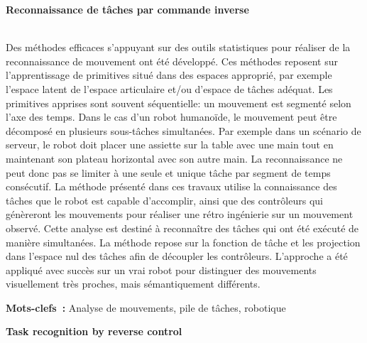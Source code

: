 
\markboth{}{}
\pagestyle{empty}

{\small
\noindent\begin{normalsize}\textbf{Reconnaissance de t\^aches par commande inverse}\end{normalsize}\\

Des méthodes efficaces s'appuyant sur des outils statistiques pour réaliser de la reconnaissance de mouvement ont été développé. Ces méthodes reposent sur l'apprentissage de primitives situé dans des espaces approprié, par exemple l'espace latent de l'espace articulaire et/ou d'espace de tâches
adéquat. Les primitives apprises sont souvent séquentielle: un mouvement est segmenté selon l'axe des temps. Dans le cas d'un robot humanoïde, le mouvement peut être décomposé en plusieurs sous-tâches
simultanées. Par exemple dans un scénario de serveur, le robot doit placer une assiette sur la table avec une main tout en maintenant son plateau horizontal avec son autre main. La reconnaissance ne peut donc pas se limiter à une seule et unique tâche par segment de temps consécutif. La méthode présenté dans ces travaux utilise la connaissance des tâches que le robot est capable d'accomplir, ainsi que des contrôleurs qui génèreront les mouvements  pour réaliser une rétro ingénierie sur un mouvement observé. Cette analyse est destiné à reconnaître des tâches qui ont été exécuté de manière simultanées. La méthode repose sur la fonction de tâche et les projection dans l'espace nul des tâches afin de découpler les contrôleurs. L'approche a été appliqué avec succès sur un vrai robot pour distinguer des mouvements visuellement très proches, mais sémantiquement différents. 

\medskip
\noindent 

\textbf{Mots-clefs~:} Analyse de mouvements, pile de t\^aches, robotique

\vspace{0.5cm}

\noindent\begin{normalsize}\textbf{Task recognition by reverse control}\end{normalsize}\\

}

